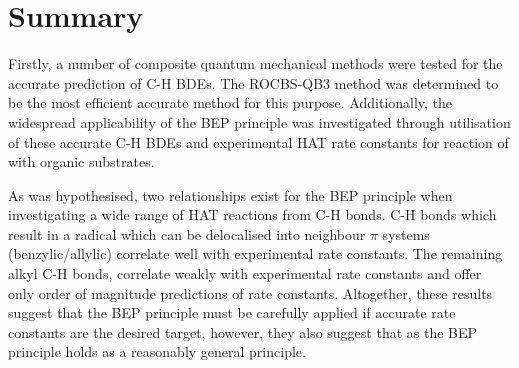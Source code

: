 
\section{Summary}

Firstly, a number of composite quantum mechanical methods were tested for the accurate prediction of C-H BDEs. The ROCBS-QB3 method was determined to be the most efficient accurate method for this purpose. Additionally, the widespread applicability of the BEP principle was investigated through utilisation of these accurate C-H BDEs and experimental HAT rate constants for reaction of \cumo with organic substrates.

As was hypothesised, two relationships exist for the BEP principle when investigating a wide range of HAT reactions from C-H bonds. C-H bonds which result in a radical which can be delocalised into neighbour $\pi$ systems (benzylic/allylic) correlate well with experimental rate constants. The remaining alkyl C-H bonds, correlate weakly with experimental rate constants and offer only order of magnitude predictions of rate constants. Altogether, these results suggest that the BEP principle must be carefully applied if accurate rate constants are the desired target, however, they also suggest that as the BEP principle holds as a reasonably general principle.
